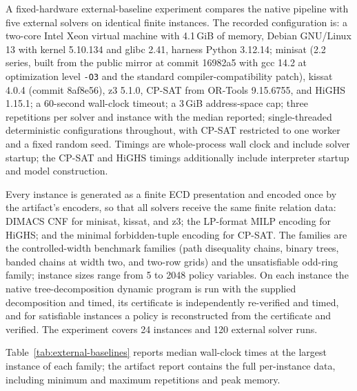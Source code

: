 \documentclass[11pt]{article}
\theoremstyle{plain}
\theoremstyle{definition}
\theoremstyle{remark}
\begin{document}
A fixed-hardware external-baseline experiment compares the native pipeline with
five external solvers on identical finite instances.  The recorded
configuration is: a two-core Intel Xeon virtual machine with 4.1\,GiB of
memory, Debian GNU/Linux 13 with kernel 5.10.134 and glibc 2.41, harness
Python 3.12.14; minisat (2.2 series, built from the public mirror at commit
16982a5 with gcc 14.2 at optimization level \texttt{-O3} and the standard
compiler-compatibility patch), kissat 4.0.4 (commit 8af8e56), z3 5.1.0, CP-SAT
from OR-Tools 9.15.6755, and HiGHS 1.15.1; a 60-second wall-clock timeout; a
3\,GiB address-space cap; three repetitions per solver and instance with the
median reported; single-threaded deterministic configurations throughout, with
CP-SAT restricted to one worker and a fixed random seed.  Timings are
whole-process wall clock and include solver startup; the CP-SAT and HiGHS
timings additionally include interpreter startup and model construction.

Every instance is generated as a finite ECD presentation and encoded once by
the artifact's encoders, so that all solvers receive the same finite relation
data: DIMACS CNF for minisat, kissat, and z3; the LP-format MILP encoding for
HiGHS; and the minimal forbidden-tuple encoding for CP-SAT.  The families are
the controlled-width benchmark families (path disequality chains, binary
trees, banded chains at width two, and two-row grids) and the unsatisfiable
odd-ring family; instance sizes range from 5 to 2048 policy variables.  On each
instance the native tree-decomposition dynamic program is run with the supplied
decomposition and timed, its certificate is independently re-verified and
timed, and for satisfiable instances a policy is reconstructed from the
certificate and verified.  The experiment covers 24 instances and 120 external
solver runs.

Table~\ref{tab:external-baselines} reports median wall-clock times at the
largest instance of each family; the artifact report contains the full
per-instance data, including minimum and maximum repetitions and peak memory.
\end{document}
